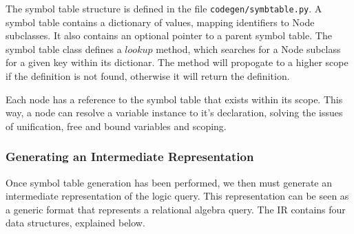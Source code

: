 \documentclass[a4paper, 11pt]{article}
\begin{document}
      The symbol table structure is defined in the file
      \texttt{codegen/symbtable.py}. A symbol table contains a dictionary of
      values, mapping identifiers to Node subclasses. It also contains an
      optional pointer to a parent symbol table. The symbol table class defines
      a $lookup$ method, which searches for a Node subclass for a given key
      within its dictionar. The method will propogate to a higher scope if the
      definition is not found, otherwise it will return the definition.

      Each node has a reference to the symbol table that exists within its
      scope. This way, a node can resolve a variable instance to it's
      declaration, solving the issues of unification, free and bound variables
      and scoping.

    \subsubsection{Generating an Intermediate Representation}

      Once symbol table generation has been performed, we then must generate an
      intermediate representation of the logic query. This representation can
      be seen as a generic format that represents a relational algebra
      query. The IR contains four data structures, explained below.
\end{document}
